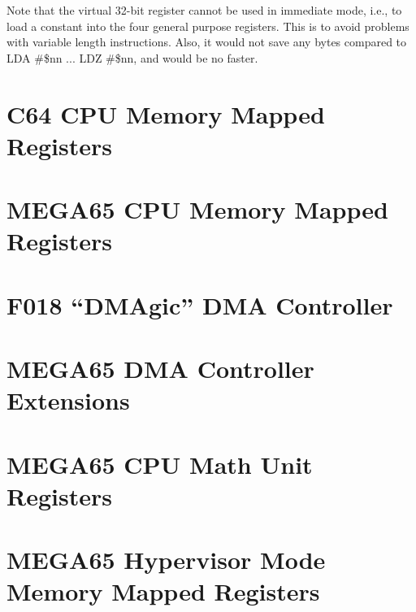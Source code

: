 Note that the virtual 32-bit register cannot be used in immediate mode, i.e., to load a constant into the four general
purpose registers.  This is to
avoid problems with variable length instructions. Also, it would not save any bytes
compared to LDA #\$nn ... LDZ #\$nn, and would be no faster.


\section{C64 CPU Memory Mapped Registers}



\section{MEGA65 CPU Memory Mapped Registers}



\section{F018 ``DMAgic'' DMA Controller}



\section{MEGA65 DMA Controller Extensions}



\section{MEGA65 CPU Math Unit Registers}



\section{MEGA65 Hypervisor Mode Memory Mapped Registers}


